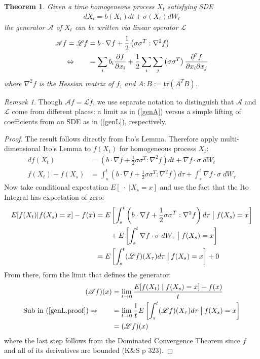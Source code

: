 \documentclass[12pt]{article}
\theoremstyle{plain}
\newtheorem{thm}{Theorem}[section]
\theoremstyle{definition}
\theoremstyle{remark}
\newtheorem*{rmk}{Remark}
\begin{document}
\begin{thm}
Given a time homogeneous process $X_t$ satisfying SDE
\begin{align*}
  dX_t = b(X_t) dt + \sigma(X_t) dW_t
\end{align*}
the generator $\mathscr{A}$ of $X_t$ can be written via linear operator
$\mathscr{L}$
\begin{align}
  \mathscr{A}f =
  \mathscr{L}f &= b \cdot \nabla f
  + \frac{1}{2} \left(\sigma \sigma^T:\nabla^2 f\right)\label{genL} \\
  \Leftrightarrow \qquad
  &= \sum_i b_i \frac{\partial f}{\partial x_i}
  + \frac{1}{2} \sum_i \sum_j \left(\sigma \sigma^T\right)
    \frac{\partial^2 f}{\partial x_i \partial x_j}\notag
\end{align}
where $\nabla^2 f$ is the Hessian matrix of $f$, and $A:B :=
\text{tr}(A^T B)$.
\end{thm}
\begin{rmk}
Though $\mathscr{A}f = \mathscr{L}f$, we use separate notation to
distinguish that $\mathscr{A}$ and $\mathscr{L}$ come from different
places: a limit as in (\ref{genA}) versus a simple lifting of
coefficients from an SDE as in (\ref{genL}), respectively.
\end{rmk}
\begin{proof}
The result follows directly from Ito's Lemma. Therefore apply
multi-dimensional Ito's Lemma to $f(X_t)$ for homogeneous process $X_t$:
\begin{align*}
  df(X_t) &=
  \left(b\cdot \nabla f + \frac{1}{2}\sigma\sigma^T : \nabla^2 f\right)
  dt
  + \nabla f\cdot \sigma \;dW_t\\
  f(X_t) - f(X_s) &=
  \int^t_s
  \left(b\cdot \nabla f + \frac{1}{2}\sigma\sigma^T : \nabla^2 f\right)
  d\tau
  +
  \int^t_s
  \nabla f\cdot \sigma \;dW_\tau
\end{align*}
Now take conditional expectation $E[\;\cdot\;|X_s=x]$ and use the fact
that the Ito Integral has expectation of zero:
\begin{align}
  E[f(X_t)|f(X_s)=x] - f(x) &=
  E\left[
  \int^t_s
  \left(b\cdot \nabla f + \frac{1}{2}\sigma\sigma^T : \nabla^2 f\right)
  d\tau
  \; \big|\; f(X_s)=x\right]\notag\\
  &\qquad
  +
  E\left[
  \int^t_s
  \nabla f\cdot \sigma \;dW_\tau
  \; \big|\;f(X_s)=x\right]
  \notag\\
  &=
  E\left[ \int^t_s (\mathscr{L} f)(X_\tau) d\tau
    \;\big|\:f(X_s)=x\right] + 0
  \label{genL.proof}
\end{align}
From there, form the limit that defines the generator:
\begin{align*}
  (\mathscr{A}f)(x)
  &=\lim_{t\rightarrow0} \frac{E[f(X_t)\;|\;f(X_s)=x] - f(x)}{t}\\
  \text{Sub in (\ref{genL.proof})} \Rightarrow\qquad
  &=\lim_{t\rightarrow0} \frac{1}{t}
  E\left[ \int^t_s (\mathscr{L} f)(X_\tau) d\tau \; \big|\:f(X_s)=x\right]\\
  &=(\mathscr{L}f)(x)
\end{align*}
where the last step follows from the Dominated Convergence Theorem since
$f$ and all of its derivatives are bounded (K\&S p 323).
\end{proof}
\end{document}

